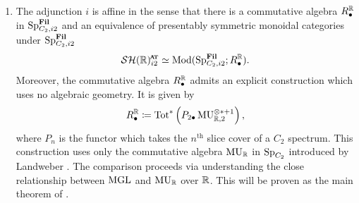 \begin{enumerate}
  This will be proven as the main theorem of .
\item The adjunction $i$ is affine in the sense that there is a commutative algebra
  $R^{\mathbb{R}}_\bullet$ in $\operatorname{\mathrm{Sp}}_{C_2,i2}^{\operatorname{\mathbf{Fil}}}$ and an equivalence of presentably symmetric monoidal categories under $\operatorname{\mathrm{Sp}}_{C_2,i2}^{\operatorname{\mathbf{Fil}}}$
  \[ \SHRat \simeq \Mod ( \Sp_{C_2,i2}^{\Fil} ; R^{\R}_\bullet ). \]
  Moreover, the commutative algebra $R^{\mathbb{R}}_\bullet$ admits an explicit construction which uses no algebraic geometry. It is given by
  \[ R_\bullet^{\mathbb{R}} \coloneqq \mathrm{Tot}^* \left( P_{2\bullet} \operatorname{\mathrm{MU}}_{\mathbb{R},2}^{\otimes * + 1} \right), \]
  where $P_{n}$ is the functor which takes the $n^{\mathrm{th}}$ slice cover of a $C_2$ spectrum.
    This construction uses only the commutative algebra $\operatorname{\mathrm{MU}}_{\mathbb{R}}$ in $\operatorname{\mathrm{Sp}}_{C_2}$ introduced by Landweber \cite{LandweberI, LandweberII}. %
  The comparison proceeds via understanding the close relationship between $\mathrm{MGL}$ and $\operatorname{\mathrm{MU}}_{\mathbb{R}}$ over $\mathbb{R}$.
  This will be proven as the main theorem of .
\end{enumerate}







